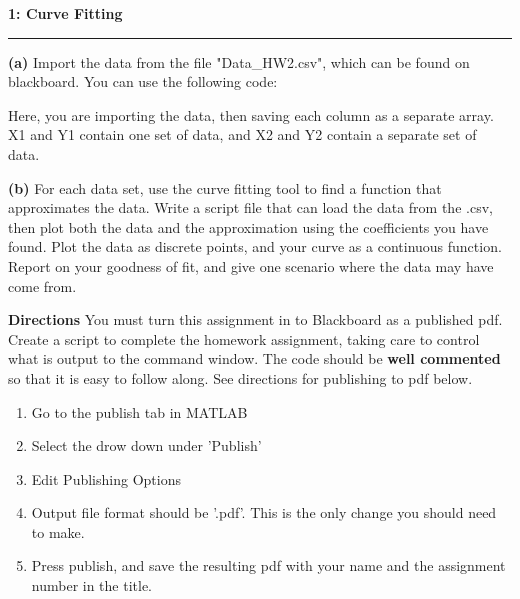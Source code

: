\documentclass[11pt]{article}
\newcommand\question[2]{\vspace{.25in}\textbf{#1: #2}\vspace{.5em}\hrule\vspace{.10in}}
\renewcommand\part[1]{\vspace{.10in}\textbf{(#1)}}
\begin{document}
\raggedright
\newcommand\NAME{Carl Kingsford}  %
\newcommand\ANDREWID{ckingsf}     %
\newcommand\HWNUM{1}              %


\question{1}{Curve Fitting} 
\part{a} Import the data from the file "Data\_HW2.csv", which can be found on blackboard. You can use the following code:

Here, you are importing the data, then saving each column as a separate array. X1 and Y1 contain one set of data, and X2 and Y2 contain a separate set of data.

\part{b} For each data set, use the curve fitting tool to find a function that approximates the data. Write a script file that can load the data from the .csv, then plot both the data and the approximation using the coefficients you have found. Plot the data as discrete points, and your curve as a continuous function. Report on your goodness of fit, and give one scenario where the data may have come from.

\vspace{2.0em}
\textbf{Directions}
You must turn this assignment in to Blackboard as a published pdf. Create a script to complete the homework assignment, taking care to control what is output to the command window. The code should be \textbf{well commented} so that it is easy to follow along. See directions for publishing to pdf below. 

\begin{enumerate} \itemsep -2pt
\item Go to the publish tab in MATLAB
\item Select the drow down under 'Publish'
\item Edit Publishing Options
\item Output file format should be '.pdf'. This is the only change you should need to make.
\item Press publish, and save the resulting pdf with your name and the assignment number in the title.
\end{enumerate}
\end{document}
